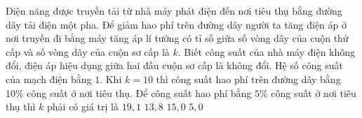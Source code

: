 \begin{vidu}%
	 Điện năng được truyền tải từ nhà máy phát điện đến nơi tiêu thụ bằng đường dây tải điện một pha. Để giảm hao phí trên đường dây người ta tăng điện áp ở nơi truyền đi bằng máy tăng áp lí tưởng có tỉ số giữa số vòng dây của cuộn thứ cấp và số vòng dây của cuộn sơ cấp là $k$. Biết công suất của nhà máy điện không đổi, điện áp hiệu dụng giữa hai đầu cuộn sơ cấp là không đổi. Hệ số công suất của mạch điện bằng $1 $. Khi $k=10$ thì công suất hao phí trên đường dây bằng $10\%$ công suất ở nơi tiêu thụ. Để công suất hao phí bằng $5\%$ công suất ở nơi tiêu thụ thì $k$ phải có giá trị là
	\choice
	{$19,1$}
	{\True $13,8$}
	{$15,0$}
	{$5,0$}
\end{vidu}
